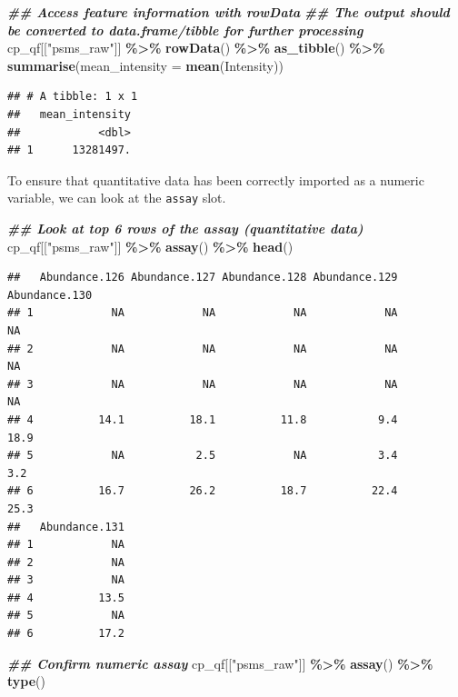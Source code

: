 \documentclass[9pt,a4paper,]{extarticle}
\newenvironment{Shaded}{\begin{snugshade}}{\end{snugshade}}
\newcommand{\AttributeTok}[1]{\textcolor[rgb]{0.13,0.29,0.53}{#1}}
\newcommand{\DocumentationTok}[1]{\textcolor[rgb]{0.56,0.35,0.01}{\textbf{\textit{#1}}}}
\newcommand{\FunctionTok}[1]{\textcolor[rgb]{0.13,0.29,0.53}{\textbf{#1}}}
\newcommand{\NormalTok}[1]{#1}
\newcommand{\SpecialCharTok}[1]{\textcolor[rgb]{0.81,0.36,0.00}{\textbf{#1}}}
\newcommand{\StringTok}[1]{\textcolor[rgb]{0.31,0.60,0.02}{#1}}
\begin{document}
\begin{Shaded}
\begin{Highlighting}[]
\DocumentationTok{\#\# Access feature information with rowData}
\DocumentationTok{\#\# The output should be converted to data.frame/tibble for further processing}
\NormalTok{cp\_qf[[}\StringTok{"psms\_raw"}\NormalTok{]] }\SpecialCharTok{\%\textgreater{}\%} 
  \FunctionTok{rowData}\NormalTok{() }\SpecialCharTok{\%\textgreater{}\%} 
  \FunctionTok{as\_tibble}\NormalTok{() }\SpecialCharTok{\%\textgreater{}\%} 
  \FunctionTok{summarise}\NormalTok{(}\AttributeTok{mean\_intensity =} \FunctionTok{mean}\NormalTok{(Intensity))}
\end{Highlighting}
\end{Shaded}

\begin{verbatim}
## # A tibble: 1 x 1
##   mean_intensity
##            <dbl>
## 1      13281497.
\end{verbatim}

To ensure that quantitative data has been correctly imported as a numeric
variable, we can look at the \texttt{assay} slot.

\begin{Shaded}
\begin{Highlighting}[]
\DocumentationTok{\#\# Look at top 6 rows of the assay (quantitative data)}
\NormalTok{cp\_qf[[}\StringTok{"psms\_raw"}\NormalTok{]] }\SpecialCharTok{\%\textgreater{}\%}
  \FunctionTok{assay}\NormalTok{() }\SpecialCharTok{\%\textgreater{}\%}
  \FunctionTok{head}\NormalTok{() }
\end{Highlighting}
\end{Shaded}

\begin{verbatim}
##   Abundance.126 Abundance.127 Abundance.128 Abundance.129 Abundance.130
## 1            NA            NA            NA            NA            NA
## 2            NA            NA            NA            NA            NA
## 3            NA            NA            NA            NA            NA
## 4          14.1          18.1          11.8           9.4          18.9
## 5            NA           2.5            NA           3.4           3.2
## 6          16.7          26.2          18.7          22.4          25.3
##   Abundance.131
## 1            NA
## 2            NA
## 3            NA
## 4          13.5
## 5            NA
## 6          17.2
\end{verbatim}

\begin{Shaded}
\begin{Highlighting}[]
\DocumentationTok{\#\# Confirm numeric assay}
\NormalTok{cp\_qf[[}\StringTok{"psms\_raw"}\NormalTok{]] }\SpecialCharTok{\%\textgreater{}\%}
  \FunctionTok{assay}\NormalTok{() }\SpecialCharTok{\%\textgreater{}\%}
  \FunctionTok{type}\NormalTok{()}
\end{Highlighting}
\end{Shaded}
\end{document}
